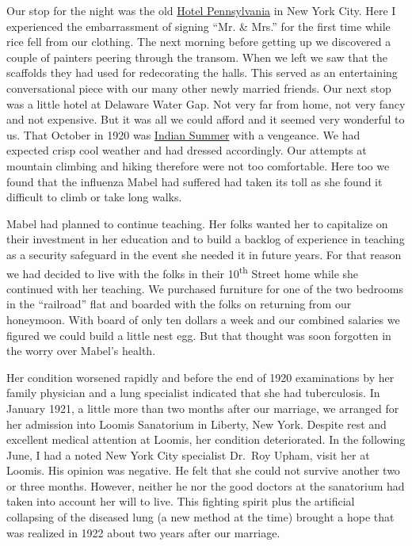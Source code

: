 \documentclass[12pt]{book}              %
\begin{document}
Our stop for the night was the old \href{http://en.wikipedia.org/wiki/Hotel_Pennsylvania}{Hotel Pennsylvania} in New York City. Here I experienced the embarrassment of signing ``Mr. \& Mrs.'' for the first time while rice fell from our clothing. The next morning before getting up we discovered a couple of painters peering through the transom. When we left we saw that the scaffolds they had used for redecorating the halls. This served as an entertaining conversational piece with our many other newly married friends. Our next stop was a little hotel at Delaware Water Gap. Not very far from home, not very fancy and not expensive. But it was all we could afford and it seemed very wonderful to us. That October in 1920 was \href{http://en.wikipedia.org/wiki/Indian_summer}{Indian Summer} with a vengeance. We had expected crisp cool weather and had dressed accordingly. Our attempts at mountain climbing and hiking therefore were not too comfortable. Here too we found that the influenza Mabel had suffered had taken its toll as she found it difficult to climb or take long walks.

Mabel had planned to continue teaching. Her folks wanted her to capitalize on their investment in her education and to build a backlog of experience in teaching as a security safeguard in the event she needed it in future years. For that reason we had decided to live with the folks in their 10\textsuperscript{th} Street home while she continued with her teaching. We purchased furniture for one of the two bedrooms in the ``railroad'' flat and boarded with the folks on returning from our honeymoon. With board of only ten dollars a week and our combined salaries we figured we could build a little nest egg. But that thought was soon forgotten in the worry over Mabel's health. 

Her condition worsened rapidly and before the end of 1920 examinations by her family physician and a lung specialist indicated that she had tuberculosis. In January 1921, a little more than two months after our marriage, we arranged for her admission into Loomis Sanatorium in Liberty, New York. Despite rest and excellent medical attention at Loomis, her condition deteriorated. In the following June, I had a noted New York City specialist Dr.~Roy Upham, visit her at Loomis. His opinion was negative. He felt that she could not survive another two or three months. However, neither he nor the good doctors at the sanatorium had taken into account her will to live. This fighting spirit plus the artificial collapsing of the diseased lung (a new method at the time) brought a hope that was realized in 1922 about two years after our marriage. 
\end{document}
